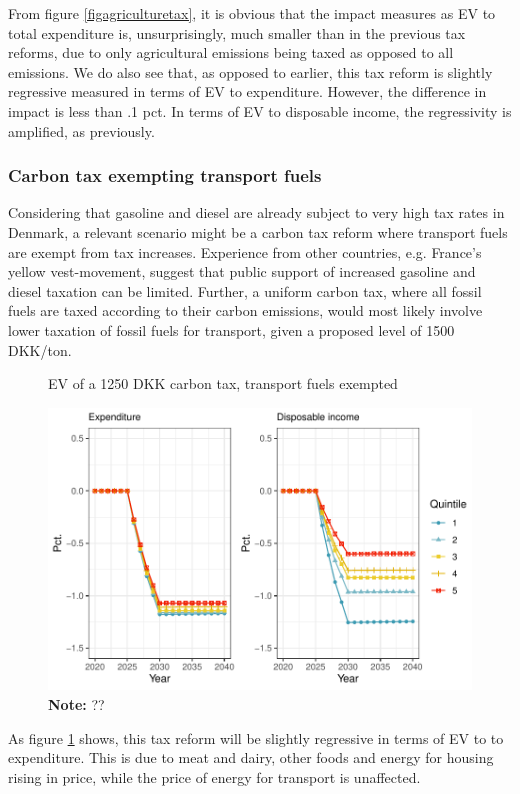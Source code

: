 From figure \ref{figagriculturetax}, it is obvious that the impact measures as EV to total expenditure is, unsurprisingly, much smaller than in the previous tax reforms, due to only agricultural emissions being taxed as opposed to all emissions. We do also see that, as opposed to earlier, this tax reform is slightly regressive measured in terms of EV to expenditure. However, the difference in impact is less than .1 pct. In terms of EV to disposable income, the regressivity is amplified, as previously. 

\subsubsection{Carbon tax exempting transport fuels}
Considering that gasoline and diesel are already subject to very high tax rates in Denmark, a relevant scenario might be a carbon tax reform where transport fuels are exempt from tax increases. Experience from other countries, e.g. France's yellow vest-movement, suggest that public support of increased gasoline and diesel taxation can be limited. Further, a uniform carbon tax, where all fossil fuels are taxed according to their carbon emissions, would most likely involve lower taxation of fossil fuels for transport, given a proposed level of 1500 DKK/ton.

\begin{figure}[H]
\centering
\caption{EV of a 1250 DKK carbon tax, transport fuels exempted}
\label{figtaxwobenz}
\includegraphics[width=.7\textwidth]{Figures/IO-resultater/benz_undtag_evtime.pdf}
\captionsetup{singlelinecheck=off,size=scriptsize}
\setlength{\captionmargin}{10pt}
\caption*{
\textbf{Note:} ??\\}
\end{figure}

As figure \ref{figtaxwobenz} shows, this tax reform will be slightly regressive in terms of EV to to expenditure. This is due to meat and dairy, other foods and energy for housing rising in price, while the price of energy for transport is unaffected.

